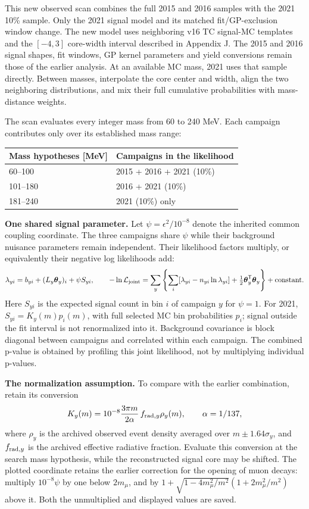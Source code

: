 \documentclass[11pt]{article}
\begin{document}
This new observed scan combines the full 2015 and 2016 samples with the 2021 10\% sample. Only the 2021 signal model and its matched fit/GP-exclusion window change. The new model uses neighboring v16 TC signal-MC templates and the $[-4,3]$ core-width interval described in Appendix J. The 2015 and 2016 signal shapes, fit windows, GP kernel parameters and yield conversions remain those of the earlier analysis. At an available MC mass, 2021 uses that sample directly. Between masses, interpolate the core center and width, align the two neighboring distributions, and mix their full cumulative probabilities with mass-distance weights.

The scan evaluates every integer mass from 60 to 240 MeV. Each campaign contributes only over its established mass range:
\begin{center}\small\begin{tabular}{ll}\toprule
Mass hypotheses [MeV] & Campaigns in the likelihood\\\midrule
60--100 & 2015 + 2016 + 2021 (10\%)\\
101--180 & 2016 + 2021 (10\%)\\
181--240 & 2021 (10\%) only\\
\bottomrule\end{tabular}\end{center}
\textbf{One shared signal parameter.} Let $\psi=\epsilon^2/10^{-8}$ denote the inherited common coupling coordinate. The three campaigns share $\psi$ while their background nuisance parameters remain independent. Their likelihood factors multiply, or equivalently their negative log likelihoods add:
\[
 \lambda_{yi}=b_{yi}+(L_y\boldsymbol\theta_y)_i+\psi S_{yi},\qquad
 -\ln\mathcal L_{\rm joint}=\sum_y\left\{\sum_i[\lambda_{yi}-n_{yi}\ln\lambda_{yi}]
 +\tfrac12\boldsymbol\theta_y^{\mathsf T}\boldsymbol\theta_y\right\}+\mathrm{constant}.
\]
Here $S_{yi}$ is the expected signal count in bin $i$ of campaign $y$ for $\psi=1$. For 2021, $S_{yi}=K_y(m)p_i(m)$, with full selected MC bin probabilities $p_i$; signal outside the fit interval is not renormalized into it. Background covariance is block diagonal between campaigns and correlated within each campaign. The combined p-value is obtained by profiling this joint likelihood, not by multiplying individual p-values.

\textbf{The normalization assumption.} To compare with the earlier combination, retain its conversion
\[
 K_y(m)=10^{-8}\frac{3\pi m}{2\alpha}\,f_{{\rm rad},y}\rho_y(m),\qquad \alpha=1/137,
\]
where $\rho_y$ is the archived observed event density averaged over $m\pm1.64\sigma_y$, and $f_{{\rm rad},y}$ is the archived effective radiative fraction. Evaluate this conversion at the search mass hypothesis, while the reconstructed signal core may be shifted. The plotted coordinate retains the earlier correction for the opening of muon decays: multiply $10^{-8}\psi$ by one below $2m_\mu$, and by $1+\sqrt{1-4m_\mu^2/m^2}(1+2m_\mu^2/m^2)$ above it. Both the unmultiplied and displayed values are saved.
\end{document}

